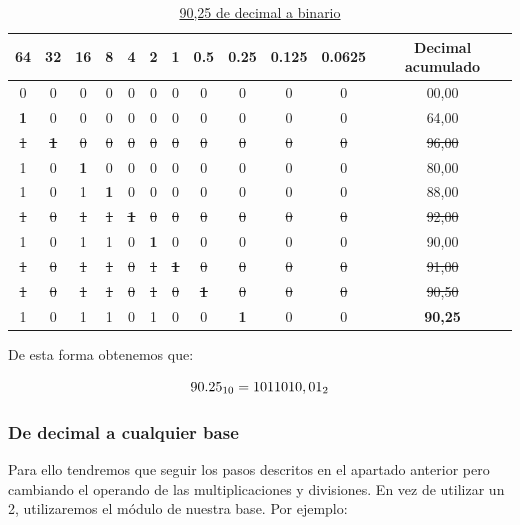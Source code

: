 \documentclass[12pt]{article}
\begin{document}
						\begin{table}[H]
							\centering
							\caption*{\underline{90,25 de decimal a binario}}
							\begin{tabular}{ccccccc|cccc||c}
								\toprule
								64 & 32 & 16 & 8 & 4 & 2 & 1 & 0.5 & 0.25 & 0.125 & 0.0625 & Decimal acumulado \\
								\midrule
								0 & 0 & 0 & 0 & 0 & 0 & 0 & 0 & 0 & 0 & 0 & 00,00 \\
								\textbf{1} & 0 & 0 & 0 & 0 & 0 & 0 & 0 & 0 & 0 & 0 & 64,00 \\
								\st{1}&\st{\textbf{1}}&\st{0}&\st{0}&\st{0}&\st{0}&\st{0}&\st{0}&\st{0}&\st{0}&\st{0}&\st{96,00} \\
								1 & 0 & \textbf{1} & 0 & 0 & 0 & 0 & 0 & 0 & 0 & 0 & 80,00 \\
								1 & 0 & 1 & \textbf{1} & 0 & 0 & 0 & 0 & 0 & 0 & 0 & 88,00 \\
								\st{1}&\st{0}&\st{1}&\st{1}&\st{\textbf{1}}&\st{0}&\st{0}&\st{0}&\st{0}&\st{0}&\st{0}&\st{92,00} \\
								1 & 0 & 1 & 1 & 0 & \textbf{1} & 0 & 0 & 0 & 0 & 0 & 90,00 \\
								\st{1}&\st{0}&\st{1}&\st{1}&\st{0}&\st{1}&\st{\textbf{1}}&\st{0}&\st{0}&\st{0}&\st{0}&\st{91,00} \\
								\st{1}&\st{0}&\st{1}&\st{1}&\st{0}&\st{1}&\st{0}&\st{\textbf{1}}&\st{0}&\st{0}&\st{0}&\st{90,50} \\
								1 & 0 & 1 & 1 & 0 & 1 & 0 & 0 & \textbf{1} & 0 & 0 & \textbf{90,25} \\
								\bottomrule
							\end{tabular}
						\end{table}
						
						De esta forma obtenemos que:
						
						\begin{equation}
							\notag
							90.25_{10} = 1011010,01_{2}
						\end{equation}
					
						\newpage
						
			\subsubsection{De decimal a cualquier base}
			
				Para ello tendremos que seguir los pasos descritos en el apartado anterior pero cambiando el operando de las multiplicaciones y divisiones. En vez de utilizar un 2, utilizaremos el módulo de nuestra base. Por ejemplo:\\
				
\end{document}
